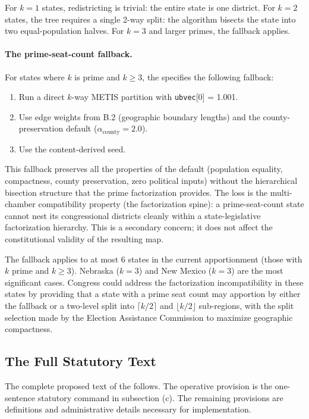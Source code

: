 For $k = 1$ states, redistricting is trivial: the entire state is one district.
For $k = 2$ states, the \hh{} tree requires a single 2-way split: the algorithm
bisects the state into two equal-population halves.
For $k = 3$ and larger primes, the fallback applies.

\paragraph{The prime-seat-count fallback.}
For states where $k$ is prime and $k \geq 3$, the \dia{} specifies the
following fallback:
\begin{enumerate}
  \item Run a direct $k$-way METIS partition with \texttt{ubvec}[0] = 1.001.
  \item Use edge weights from B.2 (geographic boundary lengths) and the
    county-preservation default ($\alpha_\text{county} = 2.0$).
  \item Use the content-derived seed.
\end{enumerate}

This fallback preserves all the properties of the \ar{} default
(population equality, compactness, county preservation, zero political inputs)
without the hierarchical bisection structure that the prime factorization
provides.
The loss is the multi-chamber compatibility property (the factorization spine):
a prime-seat-count state cannot nest its congressional districts cleanly
within a state-legislative factorization hierarchy.
This is a secondary concern; it does not affect the constitutional validity
of the resulting map.

The fallback applies to at most 6 states in the current apportionment
(those with $k$ prime and $k \geq 3$).
Nebraska ($k=3$) and New Mexico ($k=3$) are the most significant cases.
Congress could address the factorization incompatibility in these states
by providing that a state with a prime seat count may apportion by either
the fallback or a two-level split into $\lceil k/2 \rceil$ and $\lfloor k/2 \rfloor$
sub-regions, with the split selection made by the Election Assistance Commission
to maximize geographic compactness.

\subsection{The Full Statutory Text}

The complete proposed text of the \dia{} follows.
The operative provision is the one-sentence statutory command in subsection (c).
The remaining provisions are definitions and administrative details necessary
for implementation.

